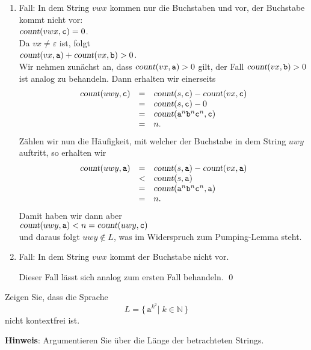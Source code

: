 \begin{enumerate}
\item Fall: In dem String $vwx$ kommen nur die Buchstaben  und  vor,  der Buchstabe
       kommt nicht vor: 
      \\[0.2cm]
      \hspace*{1.3cm}
      $\textsl{count}(vwx,\mathtt{c}) = 0$.
      \\[0.2cm]
      Da $vx \not= \varepsilon$ ist, folgt
      \\[0.2cm]
      \hspace*{1.3cm}
      $\textsl{count}(vx,\mathtt{a}) + \textsl{count}(vx,\mathtt{b}) > 0$.
      \\[0.2cm]
      Wir nehmen zun\"achst an, dass $\textsl{count}(vx,\mathtt{a}) > 0$ gilt,
      der Fall $\textsl{count}(vx,\mathtt{b}) > 0$ ist analog zu behandeln.
      Dann erhalten wir einerseits
      \[ 
      \begin{array}[t]{lcl}
        \textsl{count}(uwy,\mathtt{c}) & = & \textsl{count}(s,\mathtt{c}) - \textsl{count}(vx,\mathtt{c}) \\
                              & = & \textsl{count}(s,\mathtt{c}) - 0 \\
                              & = & \textsl{count}(\mathtt{a}^n\mathtt{b}^n\mathtt{c}^n,\mathtt{c}) \\
                              & = & n.
      \end{array}
      \]
      Z\"ahlen wir nun die H\"aufigkeit, mit welcher der Buchstabe 
      in dem String $uwy$ auftritt, so erhalten wir
      \[ 
      \begin{array}[t]{lcl}
        \textsl{count}(uwy,\mathtt{a}) & = & 
        \textsl{count}(s,\mathtt{a})  - \textsl{count}(vx,\mathtt{a}) \\
                              & < & \textsl{count}(s,\mathtt{a}) \\
                              & = & \textsl{count}(\mathtt{a}^n\mathtt{b}^n\mathtt{c}^n,\mathtt{a}) \\
                              & = & n.
      \end{array}
      \]
      Damit haben wir dann aber
      \\[0.2cm]
      \hspace*{1.3cm}
      $\textsl{count}(uwy,\mathtt{a}) < n = \textsl{count}(uwy,\mathtt{c})$
      \\[0.2cm]
      und daraus folgt $uwy \not\in L$, was im Widerspruch zum Pumping-Lemma steht.
\item Fall: In dem String $vwx$ kommt der Buchstabe  nicht vor.
   
      Dieser Fall l\"asst sich analog zum ersten Fall behandeln. \qed
\end{enumerate}

\exercise
Zeigen Sie, dass die Sprache 
\[ L = \bigl\{ \,\mathtt{a}^{k^2} \big|\; k \in \mathbb{N}\, \bigr\} \]
nicht kontextfrei ist.
\vspace*{0.2cm}

\noindent
\textbf{Hinweis}: Argumentieren Sie \"uber die L\"ange der betrachteten Strings.

